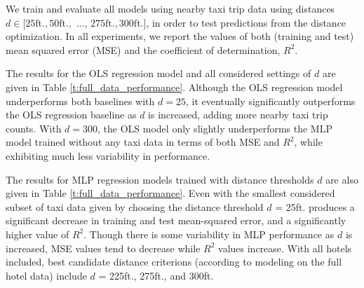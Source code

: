 \documentclass[useAMS, referee, usenatbib]{biom}
\begin{document}
We train and evaluate all models using nearby taxi trip data using distances $d \in [25 \mathrm{ft.}, 50 \mathrm{ft.},$ ..., $275 \mathrm{ft.}, 300 \mathrm{ft.}]$, in order to test predictions from the distance optimization. In all experiments, we report the values of both (training and test) mean squared error (MSE) and the coefficient of determination, $R^2$.

The results for the OLS regression model and all considered settings of $d$ are given in Table \ref{t:full_data_performance}. Although the OLS regression model underperforms both baselines with $d = 25$, it eventually significantly outperforms the OLS regression baseline as $d$ is increased, adding more nearby taxi trip counts. With $d = 300$, the OLS model only slightly underperforms the MLP model trained without any taxi data in terms of both MSE and $R^2$, while exhibiting much less variability in performance.

The results for MLP regression models trained with distance thresholds $d$ are also given in Table \ref{t:full_data_performance}. Even with the smallest considered subset of taxi data given by choosing the distance threshold $d$ = 25ft. produces a significant decrease in training and test mean-squared error, and a significantly higher value of $R^2$. Though there is some variability in MLP performance as $d$ is increased, MSE values tend to decrease while $R^2$ values increase. With all hotels included, best candidate distance criterions (according to modeling on the full hotel data) include $d$ = 225ft., 275ft., and 300ft.
\end{document}
